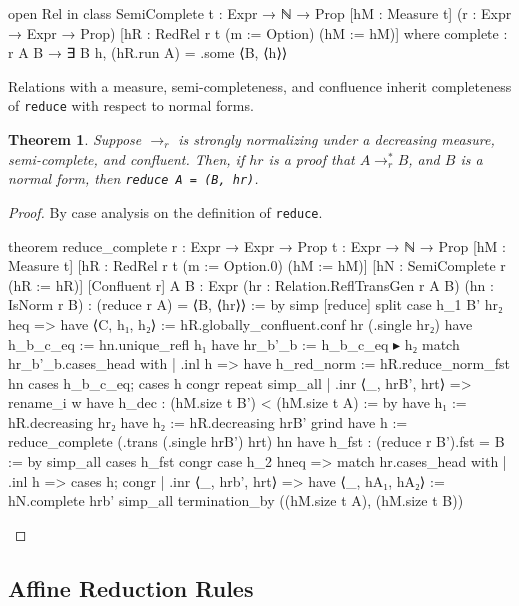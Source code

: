 \documentclass{article}
\newtheorem{theorem}{Theorem}
\begin{document}
\begin{leancode}
open Rel in class SemiComplete {t : Expr → ℕ → Prop} [hM : Measure t]
  (r : Expr → Expr → Prop)
  [hR : RedRel r t (m := Option) (hM := hM)] where
  complete : r A B → ∃ B h, (hR.run A) = .some ⟨B, ⟨h⟩⟩
\end{leancode}

Relations with a measure, semi-completeness, and confluence inherit completeness of \texttt{reduce} with respect to normal forms.

\begin{theorem}
  Suppose \(\rightarrow_{r}\) is strongly normalizing under a decreasing measure, semi-complete, and confluent. Then, if \(hr\) is a proof that \(A \rightarrow_{r}^{*} B\), and \(B\) is a normal form, then \texttt{reduce A = (B, hr)}.
\end{theorem}

\begin{proof}
By case analysis on the definition of \texttt{reduce}.

\begin{leancode}
theorem reduce_complete {r : Expr → Expr → Prop} {t : Expr → ℕ → Prop}
  [hM : Measure t] [hR : RedRel r t (m := Option.{0}) (hM := hM)] [hN : SemiComplete r (hR := hR)] [Confluent r]
  {A B : Expr} (hr : Relation.ReflTransGen r A B) (hn : IsNorm r B) : (reduce r A) = ⟨B, ⟨hr⟩⟩ := by
  simp [reduce]
  split
  case h_1 B' hr₂ heq =>
    have ⟨C, h₁, h₂⟩ := hR.globally_confluent.conf hr (.single hr₂)
    have h_b_c_eq := hn.unique_refl h₁
    have hr_b'_b := h_b_c_eq ▸ h₂
    match hr_b'_b.cases_head with
    | .inl h =>
      have h_red_norm := hR.reduce_norm_fst hn
      cases h_b_c_eq; cases h
      congr
      repeat simp_all
    | .inr ⟨_, hrB', hrt⟩ =>
      rename_i w
      have h_dec : (hM.size t B') < (hM.size t A) := by
        have h₁ := hR.decreasing hr₂
        have h₂ := hR.decreasing hrB'
        grind
      have h := reduce_complete (.trans (.single hrB') hrt) hn
      have h_fst : (reduce r B').fst = B := by
        simp_all
      cases h_fst
      congr
  case h_2 hneq =>
    match hr.cases_head with
    | .inl h => cases h; congr
    | .inr ⟨_, hrb', hrt⟩ =>
      have ⟨_, hA₁, hA₂⟩ := hN.complete hrb'
      simp_all
termination_by ((hM.size t A), (hM.size t B))
\end{leancode}
\end{proof}

\subsection{Affine Reduction Rules}\label{aff_red}
\end{document}
